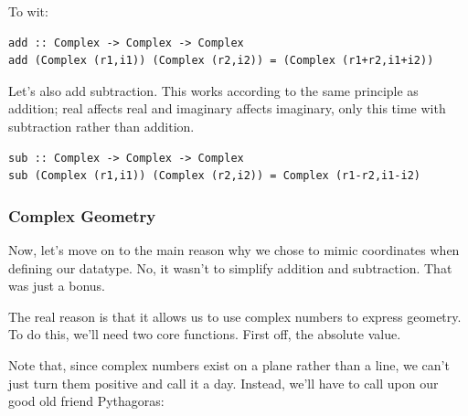 To wit:

\begin{verbatim}
add :: Complex -> Complex -> Complex
add (Complex (r1,i1)) (Complex (r2,i2)) = (Complex (r1+r2,i1+i2))
\end{verbatim}

Let's also add subtraction. This works according to the same principle as addition; real affects real and imaginary affects imaginary, only this time with subtraction rather than addition. 
\begin{verbatim}
sub :: Complex -> Complex -> Complex
sub (Complex (r1,i1)) (Complex (r2,i2)) = Complex (r1-r2,i1-i2)
\end{verbatim}

\subsubsection{Complex Geometry}

Now, let's move on to the main reason why we chose to mimic coordinates when defining our datatype. No, it wasn't to simplify addition and subtraction. That was just a bonus.

The real reason is that it allows us to use complex numbers to express geometry. To do this, we'll need two core functions. First off, the absolute value.

Note that, since complex numbers exist on a plane rather than a line, we can't just turn them positive and call it a day. Instead, we'll have to call upon our good old friend Pythagoras:

